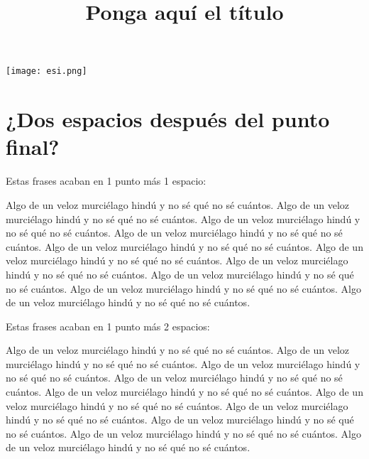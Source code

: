 \documentclass[a4paper, 11pt]{article}
\title{Ponga aquí el título}
\begin{document}
\begin{center}
\texttt{[image: esi.png]}
\end{center}





\newpage
\section{¿Dos espacios después del punto final?}

\noindent
Estas frases acaban en 1 punto más 1 espacio:

Algo de un veloz murciélago hindú y no sé qué no sé cuántos. Algo de un veloz murciélago hindú y no sé qué no sé cuántos. Algo de un veloz murciélago hindú y no sé qué no sé cuántos. Algo de un veloz murciélago hindú y no sé qué no sé cuántos. Algo de un veloz murciélago hindú y no sé qué no sé cuántos. Algo de un veloz murciélago hindú y no sé qué no sé cuántos. Algo de un veloz murciélago hindú y no sé qué no sé cuántos. Algo de un veloz murciélago hindú y no sé qué no sé cuántos. Algo de un veloz murciélago hindú y no sé qué no sé cuántos. Algo de un veloz murciélago hindú y no sé qué no sé cuántos.

\smallskip
\noindent
Estas frases acaban en 1 punto más 2 espacios:

Algo de un veloz murciélago hindú y no sé qué no sé cuántos.  Algo de un veloz murciélago hindú y no sé qué no sé cuántos.  Algo de un veloz murciélago hindú y no sé qué no sé cuántos.  Algo de un veloz murciélago hindú y no sé qué no sé cuántos.  Algo de un veloz murciélago hindú y no sé qué no sé cuántos.  Algo de un veloz murciélago hindú y no sé qué no sé cuántos.  Algo de un veloz murciélago hindú y no sé qué no sé cuántos.  Algo de un veloz murciélago hindú y no sé qué no sé cuántos.  Algo de un veloz murciélago hindú y no sé qué no sé cuántos.  Algo de un veloz murciélago hindú y no sé qué no sé cuántos.
\end{document}
